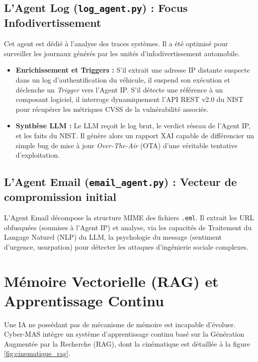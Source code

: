 \documentclass[a4paper, 12pt]{report}
\begin{document}
\subsection{L'Agent Log (\texttt{log\_agent.py}) : Focus Infodivertissement}
Cet agent est dédié à l'analyse des traces systèmes. Il a été optimisé pour surveiller les journaux générés par les unités d'infodivertissement automobile.
\begin{itemize}
    \item \textbf{Enrichissement et Triggers :} S'il extrait une adresse IP distante suspecte dans un log d'authentification du véhicule, il suspend son exécution et déclenche un \textit{Trigger} vers l'Agent IP. S'il détecte une référence à un composant logiciel, il interroge dynamiquement l'API REST v2.0 du NIST \cite{nist_nvd} pour récupérer les métriques CVSS de la vulnérabilité associée.
    \item \textbf{Synthèse LLM :} Le LLM reçoit le log brut, le verdict réseau de l'Agent IP, et les faits du NIST. Il génère alors un rapport XAI capable de différencier un simple bug de mise à jour \textit{Over-The-Air} (OTA) d'une véritable tentative d'exploitation.
\end{itemize}

\subsection{L'Agent Email (\texttt{email\_agent.py}) : Vecteur de compromission initial}
L'Agent Email décompose la structure MIME des fichiers \texttt{.eml}. Il extrait les URL obfusquées (soumises à l'Agent IP) et analyse, via les capacités de Traitement du Langage Naturel (NLP) du LLM, la psychologie du message (sentiment d'urgence, usurpation) pour détecter les attaques d'ingénierie sociale complexes.

\section{Mémoire Vectorielle (RAG) et Apprentissage Continu}
\label{sec:memoire_vectorielle}

Une IA ne possédant pas de mécanisme de mémoire est incapable d'évoluer. Cyber-MAS intègre un système d'apprentissage continu basé sur la Génération Augmentée par la Recherche (RAG), dont la cinématique est détaillée à la figure \ref{fig:cinematique_rag}.
\end{document}

